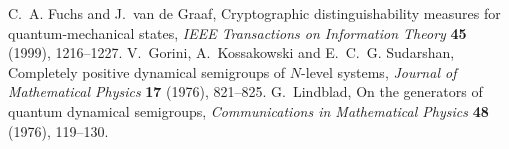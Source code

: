  C.~A. Fuchs and J.~van de Graaf, Cryptographic distinguishability measures for quantum-mechanical states, \emph{IEEE Transactions on Information Theory} \textbf{45} (1999), 1216--1227.
 V.~Gorini, A.~Kossakowski and E.~C.~G. Sudarshan, Completely positive dynamical semigroups of $N$-level systems, \emph{Journal of Mathematical Physics} \textbf{17} (1976), 821--825.
 G.~Lindblad, On the generators of quantum dynamical semigroups, \emph{Communications in Mathematical Physics} \textbf{48} (1976), 119--130.
